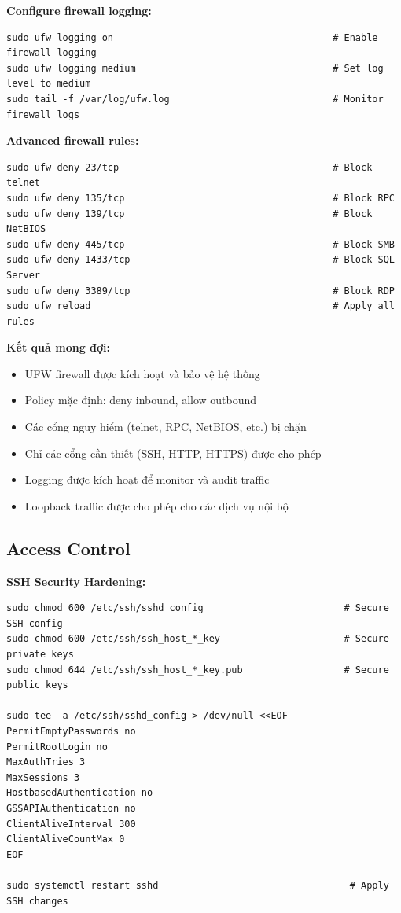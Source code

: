 \noindent \textbf{Configure firewall logging:}
\begin{verbatim}
sudo ufw logging on                                       # Enable firewall logging
sudo ufw logging medium                                   # Set log level to medium
sudo tail -f /var/log/ufw.log                             # Monitor firewall logs
\end{verbatim}

\noindent \textbf{Advanced firewall rules:}
\begin{verbatim}
sudo ufw deny 23/tcp                                      # Block telnet
sudo ufw deny 135/tcp                                     # Block RPC
sudo ufw deny 139/tcp                                     # Block NetBIOS
sudo ufw deny 445/tcp                                     # Block SMB
sudo ufw deny 1433/tcp                                    # Block SQL Server
sudo ufw deny 3389/tcp                                    # Block RDP
sudo ufw reload                                           # Apply all rules
\end{verbatim}

\noindent \textbf{Kết quả mong đợi:}
\begin{itemize}
\item UFW firewall được kích hoạt và bảo vệ hệ thống
\item Policy mặc định: deny inbound, allow outbound
\item Các cổng nguy hiểm (telnet, RPC, NetBIOS, etc.) bị chặn
\item Chỉ các cổng cần thiết (SSH, HTTP, HTTPS) được cho phép
\item Logging được kích hoạt để monitor và audit traffic
\item Loopback traffic được cho phép cho các dịch vụ nội bộ
\end{itemize}

\subsection{Access Control}

\noindent \textbf{SSH Security Hardening:}
\begin{verbatim}
sudo chmod 600 /etc/ssh/sshd_config                         # Secure SSH config
sudo chmod 600 /etc/ssh/ssh_host_*_key                      # Secure private keys
sudo chmod 644 /etc/ssh/ssh_host_*_key.pub                  # Secure public keys

sudo tee -a /etc/ssh/sshd_config > /dev/null <<EOF
PermitEmptyPasswords no
PermitRootLogin no
MaxAuthTries 3
MaxSessions 3
HostbasedAuthentication no
GSSAPIAuthentication no
ClientAliveInterval 300
ClientAliveCountMax 0
EOF

sudo systemctl restart sshd                                  # Apply SSH changes
\end{verbatim}

